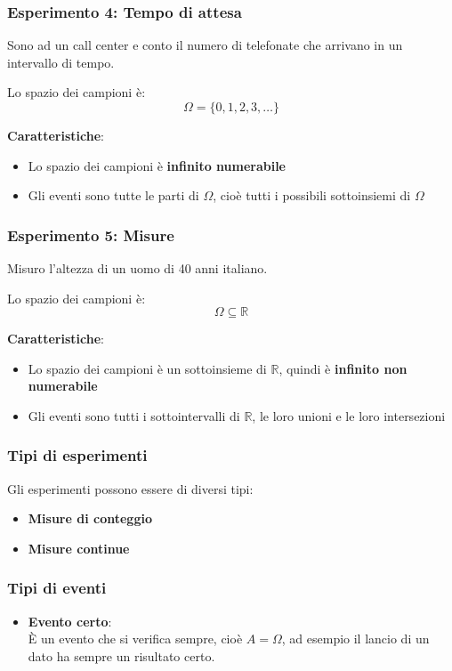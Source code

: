 \documentclass[a4paper]{article}
\theoremstyle{break}
\theoremstyle{break}
\theoremstyle{break}
\theoremstyle{break}
\begin{document}
\subsubsection{Esperimento 4: Tempo di attesa}
Sono ad un call center e conto il numero di telefonate che arrivano in un intervallo di tempo.

\noindent Lo spazio dei campioni è:
\[
  \Omega = \{0, 1, 2, 3, \ldots\}
\] 

\textbf{Caratteristiche}:
\begin{itemize}
  \item Lo spazio dei campioni è \textbf{infinito numerabile}
  \item Gli eventi sono tutte le parti di \( \Omega \), cioè tutti i possibili sottoinsiemi
    di \( \Omega \)
\end{itemize}

\subsubsection{Esperimento 5: Misure}
Misuro l’altezza di un uomo di 40 anni italiano.

\noindent Lo spazio dei campioni è:
\[
  \Omega \subseteq \mathbb{R}
\] 

\textbf{Caratteristiche}:
\begin{itemize}
  \item Lo spazio dei campioni è un sottoinsieme di \( \mathbb{R} \), quindi è
    \textbf{infinito non numerabile}
  \item Gli eventi sono tutti i sottointervalli di \( \mathbb{R} \), le loro unioni e le 
    loro intersezioni
\end{itemize}

\subsubsection{Tipi di esperimenti}
Gli esperimenti possono essere di diversi tipi:
\begin{itemize}
  \item \textbf{Misure di conteggio}
  \item \textbf{Misure continue}
\end{itemize}

\subsubsection{Tipi di eventi}
\begin{itemize}
  \item \textbf{Evento certo}:\\
    È un evento che si verifica sempre, cioè \( A = \Omega \), ad esempio il lancio di
    un dato ha sempre un risultato certo.
\end{itemize}
\end{document}
